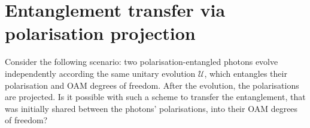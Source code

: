 \documentclass[
	aps, pra, authorblock, superscriptaddress, twocolumn,
	10pt
]{revtex4-1}
\begin{document}

\section{Entanglement transfer via polarisation projection}
Consider the following scenario: two polarisation-entangled photons evolve independently according the same unitary evolution $\mathcal U$, which entangles their polarisation and OAM degrees of freedom. After the evolution, the polarisations are projected. Is it possible with such a scheme to transfer the entanglement, that was initially shared between the photons' polarisations, into their OAM degrees of freedom?
\end{document}
